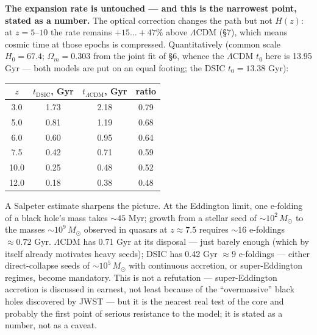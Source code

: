 \documentclass{article}
\begin{document}
\medskip
\noindent\textbf{The expansion rate is untouched --- and this is the narrowest point, stated as a number.} The optical correction changes the path but not $H(z)$: at $z = 5\text{--}10$ the rate remains $+15\ldots+47\%$ above $\Lambda$CDM (\S7), which means cosmic time at those epochs is compressed. Quantitatively (common scale $H_0 = 67.4$; $\Omega_m = 0.303$ from the joint fit of \S6, whence the $\Lambda$CDM $t_0$ here is 13.95 Gyr --- both models are put on an equal footing; the DSIC $t_0 = 13.38$ Gyr):

\begin{table}[htbp]
\centering
\small
\begin{tabular}{@{}cccc@{}}
\toprule
$z$ & $t_{\text{DSIC}}$, Gyr & $t_{\Lambda\text{CDM}}$, Gyr & ratio \\
\midrule
3.0 & 1.73 & 2.18 & 0.79 \\
5.0 & 0.81 & 1.19 & 0.68 \\
6.0 & 0.60 & 0.95 & 0.64 \\
7.5 & 0.42 & 0.71 & 0.59 \\
10.0 & 0.25 & 0.48 & 0.52 \\
12.0 & 0.18 & 0.38 & 0.48 \\
\bottomrule
\end{tabular}
\end{table}

A Salpeter estimate sharpens the picture. At the Eddington limit, one e-folding of a black hole's mass takes ${\sim}45$ Myr; growth from a stellar seed of ${\sim}10^2\,M_\odot$ to the masses ${\sim}10^9\,M_\odot$ observed in quasars at $z \approx 7.5$ requires ${\sim}16$ e-foldings $\approx 0.72$ Gyr. $\Lambda$CDM has 0.71 Gyr at its disposal --- just barely enough (which by itself already motivates heavy seeds); DSIC has 0.42 Gyr $\approx 9$ e-foldings --- either direct-collapse seeds of ${\sim}10^5\,M_\odot$ with continuous accretion, or super-Eddington regimes, become mandatory. This is not a refutation --- super-Eddington accretion is discussed in earnest, not least because of the ``overmassive'' black holes discovered by JWST --- but it is the nearest real test of the core and probably the first point of serious resistance to the model; it is stated as a number, not as a caveat.
\end{document}
